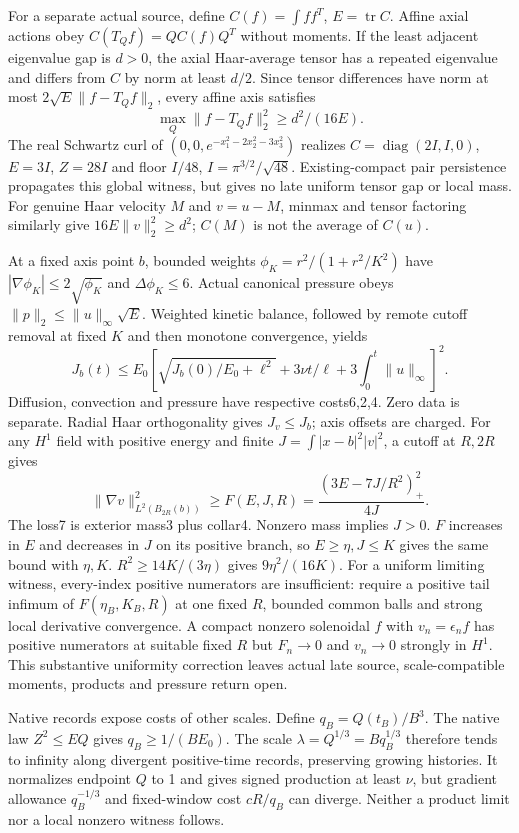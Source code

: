 \documentclass[11pt]{article}
\begin{document}
For a separate actual source, define $C(f)=\int ff^T$, $E=\operatorname{tr}C$.
Affine axial actions obey $C(T_Qf)=QC(f)Q^T$ without moments. If the least
adjacent eigenvalue gap is $d>0$, the axial Haar-average tensor has a
repeated eigenvalue and differs from $C$ by norm at least $d/2$.
Since tensor differences have norm at most $2\sqrt E\|f-T_Qf\|_2$,
every affine axis satisfies
\[
 \max_Q\|f-T_Qf\|_2^2\ge d^2/(16E).
\]
The real Schwartz curl of $(0,0,e^{-x_1^2-2x_2^2-3x_3^2})$ realizes
$C=\operatorname{diag}(2I,I,0)$, $E=3I$, $Z=28I$ and floor $I/48$,
$I=\pi^{3/2}/\sqrt{48}$. Existing-compact pair persistence propagates
this global witness, but gives no late uniform tensor gap or local mass.
For genuine Haar velocity $M$ and $v=u-M$, minmax and tensor factoring
similarly give $16E\|v\|_2^2\ge d^2$; $C(M)$ is not the average of $C(u)$.

At a fixed axis point $b$, bounded weights
$\phi_K=r^2/(1+r^2/K^2)$ have $|\nabla\phi_K|\le2\sqrt{\phi_K}$ and
$\Delta\phi_K\le6$. Actual canonical pressure obeys
$\|p\|_2\le\|u\|_\infty\sqrt E$. Weighted kinetic balance, followed by
remote cutoff removal at fixed $K$ and then monotone convergence, yields
\[
 J_b(t)\le E_0\left[\sqrt{J_b(0)/E_0+\ell^2}
              +3\nu t/\ell+3\int_0^t\|u\|_\infty\right]^2.
\]
Diffusion, convection and pressure have respective costs6,2,4.
Zero data is separate. Radial Haar orthogonality gives $J_v\le J_b$;
axis offsets are charged. For any $H^1$ field with positive energy and
finite $J=\int|x-b|^2|v|^2$, a cutoff at $R,2R$ gives
\[
 \|\nabla v\|_{L^2(B_{2R}(b))}^2
       \ge F(E,J,R)=\frac{(3E-7J/R^2)_+^2}{4J}.
\]
The loss7 is exterior mass3 plus collar4. Nonzero mass implies $J>0$.
$F$ increases in $E$ and decreases in $J$ on its positive branch, so
$E\ge\eta,J\le K$ gives the same bound with $\eta,K$.
$R^2\ge14K/(3\eta)$ gives $9\eta^2/(16K)$.
For a uniform limiting witness, every-index positive numerators are
insufficient: require a positive tail infimum of $F(\eta_B,K_B,R)$ at one
fixed $R$, bounded common balls and strong local derivative convergence.
A compact nonzero solenoidal $f$ with $v_n=\epsilon_n f$ has positive
numerators at suitable fixed $R$ but $F_n\to0$ and $v_n\to0$ strongly
in $H^1$. This substantive uniformity correction leaves actual late
source, scale-compatible moments, products and pressure return open.

Native records expose costs of other scales. Define $q_B=Q(t_B)/B^3$.
The native law $Z^2\le EQ$ gives $q_B\ge1/(BE_0)$.
The scale $\lambda=Q^{1/3}=Bq_B^{1/3}$ therefore tends to infinity
along divergent positive-time records, preserving growing histories.
It normalizes endpoint $Q$ to 1 and gives signed production at least
$\nu$, but gradient allowance $q_B^{-1/3}$ and fixed-window cost
$cR/q_B$ can diverge. Neither a product limit nor a local nonzero
witness follows.
\end{document}
